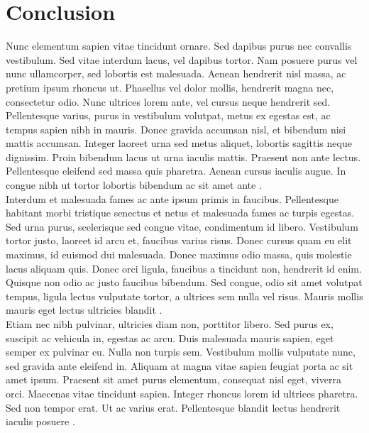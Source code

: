 \section{Conclusion}
Nunc elementum sapien vitae tincidunt ornare. Sed dapibus purus nec convallis vestibulum. Sed vitae interdum lacus, vel dapibus tortor. Nam posuere purus vel nunc ullamcorper, sed lobortis est malesuada. Aenean hendrerit nisl massa, ac pretium ipsum rhoncus ut. Phasellus vel dolor mollis, hendrerit magna nec, consectetur odio. Nunc ultrices lorem ante, vel cursus neque hendrerit sed. Pellentesque varius, purus in vestibulum volutpat, metus ex egestas est, ac tempus sapien nibh in mauris. Donec gravida accumsan nisl, et bibendum nisi mattis accumsan. Integer laoreet urna sed metus aliquet, lobortis sagittis neque dignissim. Proin bibendum lacus ut urna iaculis mattis. Praesent non ante lectus. Pellentesque eleifend sed massa quis pharetra. Aenean cursus iaculis augue. In congue nibh ut tortor lobortis bibendum ac sit amet ante \parencite[prenote][]{latexcompanion}.\\

Interdum et malesuada fames ac ante ipsum primis in faucibus. Pellentesque habitant morbi tristique senectus et netus et malesuada fames ac turpis egestas. Sed urna purus, scelerisque sed congue vitae, condimentum id libero. Vestibulum tortor justo, laoreet id arcu et, faucibus varius risus. Donec cursus quam eu elit maximus, id euismod dui malesuada. Donec maximus odio massa, quis molestie lacus aliquam quis. Donec orci ligula, faucibus a tincidunt non, hendrerit id enim. Quisque non odio ac justo faucibus bibendum. Sed congue, odio sit amet volutpat tempus, ligula lectus vulputate tortor, a ultrices sem nulla vel risus. Mauris mollis mauris eget lectus ultricies blandit \parencite{knuthwebsite}.\\

Etiam nec nibh pulvinar, ultricies diam non, porttitor libero. Sed purus ex, suscipit ac vehicula in, egestas ac arcu. Duis malesuada mauris sapien, eget semper ex pulvinar eu. Nulla non turpis sem. Vestibulum mollis vulputate nunc, sed gravida ante eleifend in. Aliquam at magna vitae sapien feugiat porta ac sit amet ipsum. Praesent sit amet purus elementum, consequat nisl eget, viverra orci. Maecenas vitae tincidunt sapien. Integer rhoncus lorem id ultrices pharetra. Sed non tempor erat. Ut ac varius erat. Pellentesque blandit lectus hendrerit iaculis posuere \parencite[see][page 4]{einstein}.